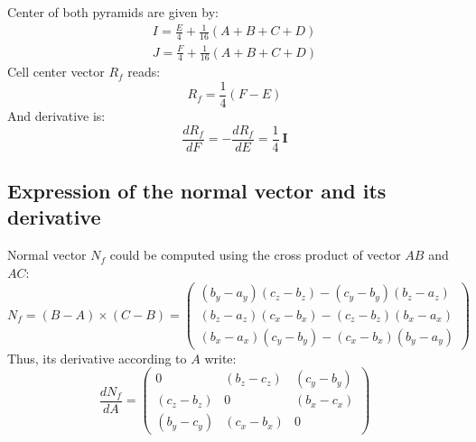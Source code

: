 \documentclass[11pt]{article}
\begin{document}
Center of both pyramids are given by:
\begin{subequations}
\begin{gather}
I = \frac{E}{4} + \frac{1}{16} (A + B + C + D) \\
J = \frac{F}{4} + \frac{1}{16} (A + B + C + D)
\end{gather}
\end{subequations} 
Cell center vector $R_f$ reads:
\begin{equation}
R_f = \frac{1}{4} (F-E)
\end{equation}
And derivative is:
\begin{equation}
\frac{d R_f}{d F} = - \frac{d R_f}{d E} = \frac{1}{4}\ \boldsymbol{I}
\end{equation}


\subsection{Expression of the normal vector and its derivative}
Normal vector $N_f$ could be computed using the cross product of vector $AB$ and $AC$:
\begin{equation}
N_f = (B-A) \times (C-B) = 
\begin{pmatrix}
(b_y-a_y)(c_z-b_z) - (c_y-b_y)(b_z-a_z)  \\
(b_z-a_z)(c_x-b_x) - (c_z-b_z)(b_x-a_x)  \\
(b_x-a_x)(c_y-b_y) - (c_x-b_x)(b_y-a_y) 
\end{pmatrix}
\end{equation}
Thus, its derivative according to $A$ write:
\begin{equation}
\frac{dN_f}{dA} = 
\begin{pmatrix}
0 & (b_z-c_z) & (c_y-b_y) \\
(c_z-b_z) & 0 & (b_x-c_x) \\
(b_y-c_y) & (c_x-b_x) & 0
\end{pmatrix}
\end{equation}
\end{document}
